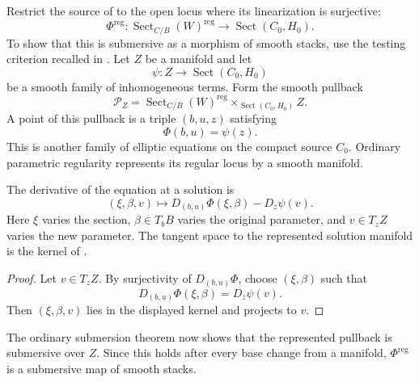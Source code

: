 Restrict the source of  to the open locus
where its linearization is surjective:
\[
  \Phi^{\mathrm{reg}}\colon
  \operatorname{Sect}_{C/B}(W)^{\mathrm{reg}}
  \longrightarrow
  \operatorname{Sect}(C_0,H_0).
\]
To show that this is submersive as a morphism of smooth stacks, use the
testing criterion recalled in
. Let $Z$ be a manifold and
let
\[
  \psi\colon Z\longrightarrow\operatorname{Sect}(C_0,H_0)
\]
be a smooth family of inhomogeneous terms. Form the smooth pullback
\begin{equation}
  \label{eq:Pardon_Test_Pullback}
  \mathcal P_Z
  =
  \operatorname{Sect}_{C/B}(W)^{\mathrm{reg}}
  \times_{\operatorname{Sect}(C_0,H_0)}Z.
\end{equation}
A point of this pullback is a triple $(b,u,z)$ satisfying
\[
  \Phi(b,u)=\psi(z).
\]
This is another family of elliptic equations on the compact source $C_0$.
Ordinary parametric regularity represents its regular locus by a smooth
manifold.

The derivative of the equation at a solution is
\begin{equation}
  \label{eq:Pardon_Base_Changed_Linearization}
  (\xi,\beta,v)
  \longmapsto
  D_{(b,u)}\Phi(\xi,\beta)-D_z\psi(v).
\end{equation}
Here $\xi$ varies the section, $\beta\in T_bB$ varies the original parameter,
and $v\in T_zZ$ varies the new parameter. The tangent space to the represented
solution manifold is the kernel of
.


\begin{proof}
  Let $v\in T_zZ$. By surjectivity of $D_{(b,u)}\Phi$, choose
  $(\xi,\beta)$ such that
  \[
    D_{(b,u)}\Phi(\xi,\beta)=D_z\psi(v).
  \]
  Then $(\xi,\beta,v)$ lies in the displayed kernel and projects to $v$.
\end{proof}

The ordinary submersion theorem now shows that the represented pullback
 is submersive over $Z$. Since this holds after
every base change from a manifold, $\Phi^{\mathrm{reg}}$ is a submersive map of
smooth stacks.

